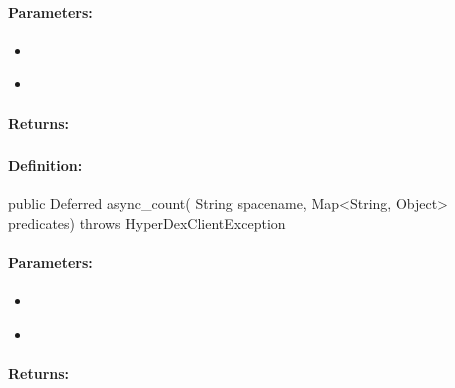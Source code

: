 \paragraph{Parameters:}
\begin{itemize}[noitemsep]
\item {}\\

\item {}\\

\end{itemize}

\paragraph{Returns:}


\pagebreak
\subsubsection{}
\label{api:java:async_count}


\paragraph{Definition:}
\begin{javacode}
public Deferred async_count(
        String spacename,
        Map<String, Object> predicates) throws HyperDexClientException
\end{javacode}

\paragraph{Parameters:}
\begin{itemize}[noitemsep]
\item {}\\

\item {}\\

\end{itemize}

\paragraph{Returns:}


